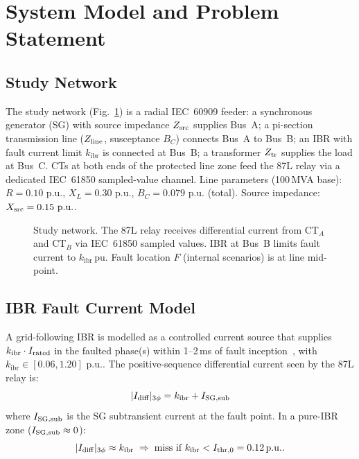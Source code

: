 \documentclass[journal,twoside,10pt]{IEEEtran}
\newcommand{\Idiff}{I_{\mathrm{diff}}}
\newcommand{\kibr}{k_{\mathrm{ibr}}}
\newcommand{\pu}{\,\text{p.u.}}
\begin{document}
\section{System Model and Problem Statement}
\label{sec:model}

\subsection{Study Network}
\label{sec:network}

The study network (Fig.~\ref{fig:system}) is a radial IEC~60909 feeder:
a synchronous generator (SG) with source impedance $Z_{\rm src}$ supplies
Bus~A; a pi-section transmission line ($Z_{\rm line}$, susceptance $B_C$)
connects Bus~A to Bus~B; an IBR with fault current limit $\kibr$ is connected
at Bus~B; a transformer $Z_{\rm tr}$ supplies the load at Bus~C.
CTs at both ends of the protected line zone feed the 87L relay via a
dedicated IEC~61850 sampled-value channel.
Line parameters (100\,MVA base): $R = 0.10\,\pu$, $X_L = 0.30\,\pu$,
$B_C = 0.079\,\pu$ (total).  Source impedance: $X_{\rm src} = 0.15\,\pu$.

\begin{figure}[!t]
  \centering
  
  \caption{Study network.  The 87L relay receives differential current
           from CT$_A$ and CT$_B$ via IEC~61850 sampled values.
           IBR at Bus~B limits fault current to $\kibr$\,pu.
           Fault location $F$ (internal scenarios) is at line mid-point.}
  \label{fig:system}
\end{figure}

\subsection{IBR Fault Current Model}
\label{sec:ibrmodel}

A grid-following IBR is modelled as a controlled current source that supplies
$\kibr \cdot I_{\rm rated}$ in the faulted phase(s) within 1--2\,ms of fault
inception~\cite{Plet2011,Guo2021}, with $\kibr \in [0.06, 1.20]\,\pu$.
The positive-sequence differential current seen by the 87L relay is:
\begin{equation}
  |\Idiff|_{3\phi} = \kibr + I_{\rm SG,sub}
  \label{eq:diff3ph}
\end{equation}
where $I_{\rm SG,sub}$ is the SG subtransient current at the fault point.
In a pure-IBR zone ($I_{\rm SG,sub} \approx 0$):
\begin{equation}
  |\Idiff|_{3\phi} \approx \kibr \;\Rightarrow\;
  \text{miss if } \kibr < I_{\rm thr,0} = 0.12\pu.
  \label{eq:failure}
\end{equation}
\end{document}
